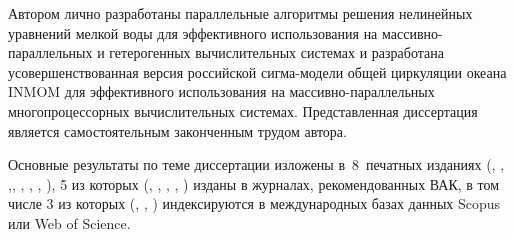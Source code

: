 {\contribution} Автором лично разработаны параллельные алгоритмы решения нелинейных уравнений мелкой воды для эффективного использования на массивно-параллельных и гетерогенных вычислительных системах и разработана усовершенствованная версия российской сигма-модели общей циркуляции океана INMOM для эффективного использования на массивно-параллельных многопроцессорных вычислительных системах. Представленная диссертация является самостоятельным законченным трудом автора. 

{\publications}
Основные результаты по теме диссертации изложены
в~8~печатных изданиях (\cite{ChaplyginINMOM2017}, \cite{ChaplyginSW2017}, \cite{ChaplyginAzov2017},\cite{DianskyInertOsc2019}, \cite{ChaplyginLB2019}, \cite{ChaplyginSW2021}, \cite{Chaplygin_Gusev_Diansky_2022}, \cite{ChaplyginINMOM2021}), 
5 из которых (\cite{ChaplyginLB2019}, \cite{ChaplyginSW2021}, \cite{ChaplyginINMOM2021}, \cite{Chaplygin_Gusev_Diansky_2022}, \cite{DianskyInertOsc2019}) изданы в журналах, рекомендованных ВАК,
в том числе 3 из которых (\cite{ChaplyginINMOM2021}, \cite{Chaplygin_Gusev_Diansky_2022}, \cite{DianskyInertOsc2019}) индексируются в международных базах данных Scopus или Web of Science.
